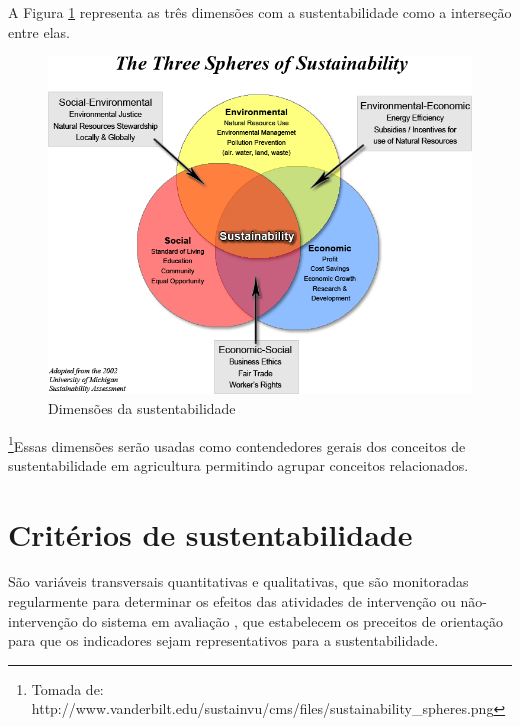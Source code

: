 A Figura \ref{fig:sustainability_spheres} representa as três dimensões
com a sustentabilidade como a interseção entre elas.

\begin{figure}[h]
\begin{centering}
\includegraphics[width=1\columnwidth]{figures/sustainability_spheres}
\par\end{centering}
\caption{Dimensões da sustentabilidade \label{fig:sustainability_spheres}}
\end{figure}

\footnote{Tomada de: http://www.vanderbilt.edu/sustainvu/cms/files/sustainability\_spheres.png}Essas
dimensões serão usadas como contendedores gerais dos conceitos de
sustentabilidade em agricultura permitindo agrupar conceitos relacionados.

\section{Critérios de sustentabilidade}

São variáveis transversais quantitativas e qualitativas, que são monitoradas
regularmente para determinar os efeitos das atividades de intervenção
ou não-intervenção do sistema em avaliação \citep{deusdara2001criterios},
que estabelecem os preceitos de orientação para que os indicadores
sejam representativos para a sustentabilidade.

